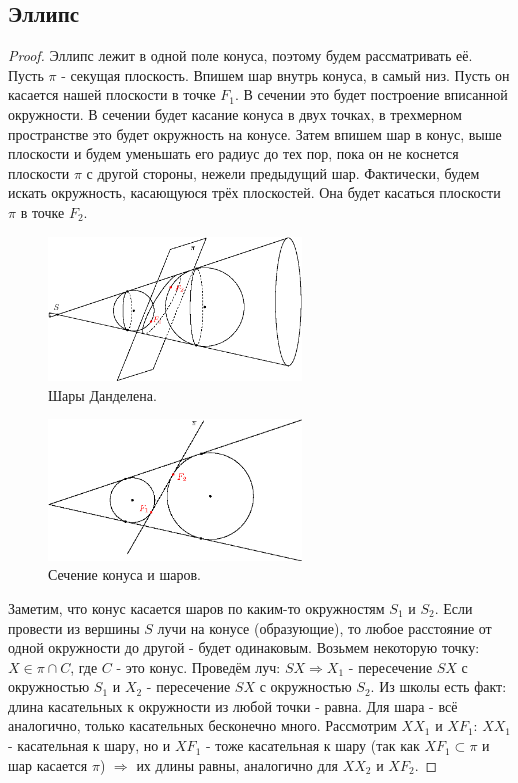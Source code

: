 \documentclass[12pt]{article}
\theoremstyle{definition}
\begin{document}
\subsection*{Эллипс}
\begin{proof}
	Эллипс лежит в одной поле конуса, поэтому будем рассматривать её. Пусть $\pi$ - секущая плоскость. Впишем шар внутрь конуса, в самый низ. Пусть он касается нашей плоскости в точке $F_1$. В сечении это будет построение вписанной окружности. В сечении будет касание конуса в двух точках, в трехмерном пространстве это будет окружность на конусе. Затем впишем шар в конус, выше плоскости и будем уменьшать его радиус до тех пор, пока он не коснется плоскости $\pi$ с другой стороны, нежели предыдущий шар. Фактически, будем искать окружность, касающуюся трёх плоскостей. Она будет  касаться плоскости $\pi$ в точке $F_2$.
	\begin{figure}[H]
		\centering
		\includegraphics[width=0.6\textwidth]{ANGL1_9.eps}
		\caption{Шары Данделена.}
		\label{1_9}
	\end{figure}
	\begin{figure}[H]
		\centering
		\includegraphics[width=0.6\textwidth]{ANGL1_10.eps}
		\caption{Сечение конуса и шаров.}
		\label{1_10}
	\end{figure}
	Заметим, что конус касается шаров по каким-то окружностям $S_1$ и $S_2$. Если провести из вершины $S$ лучи на конусе (образующие), то любое расстояние от одной окружности до другой - будет одинаковым. Возьмем некоторую точку: $X \in \pi \cap C$, где $C$ - это конус. Проведём луч: $SX \Rightarrow X_1$ - пересечение $SX$ с окружностью $S_1$ и $X_2$ - пересечение $SX$ с окружностью $S_2$. Из школы есть факт: длина касательных к окружности из любой точки - равна. Для шара - всё аналогично, только касательных бесконечно много. Рассмотрим $XX_1$ и $XF_1$: $XX_1$ - касательная к шару, но и $XF_1$ - тоже касательная к шару (так как $XF_1 \subset \pi$ и шар касается $\pi$) $\Rightarrow$ их длины равны, аналогично для $XX_2$ и $XF_2$. 

\end{proof}
\end{document}
